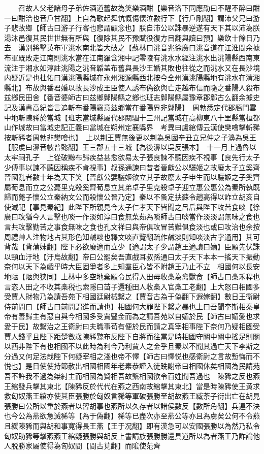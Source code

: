 　　召故人父老諸母子弟佐酒道舊故為笑樂酒酣【樂音洛下同應劭曰不醒不醉曰酣一曰酣洽也音戶甘翻】上自為歌起舞忼慨傷懷泣數行下【行戶剛翻】謂沛父兄曰游子悲故鄉【師古曰游子行客也悲謂顧念也】朕自沛公以誅暴逆遂有天下其以沛為朕湯沐邑復其民世世無有所與【復除其民不豫賦役復方目翻與讀曰預】樂飲十餘日乃去　漢别將擊英布軍洮水南北皆大破之【蘇林曰洮音兆徐廣曰洮音道在江淮間余據布軍既敗走江南則洮水當在江南羅含湘中記零陵有洮水水經注洮水出洮陽縣西南東流注于湘水如淳註洮陽之洮音韜盖布舊與長沙王婚其敗也往從之而洮水又在長沙境内疑近是也杜佑曰漢洮陽縣城在永州湘源縣西北按今全州漢洮陽縣地有洮水在清湘縣北】布故與番君婚以故長沙成王臣使人誘布偽欲與亡走越布信而隨之番陽人殺布兹鄉民田舍【番音婆師古曰兹鄉鄡陽縣之鄉也班志鄡陽縣屬豫章郡鄡古么翻余據史記及漢書高紀皆言追斬布番陽竊意兹鄉當在番陽界非鄡陽】　周勃悉定代郡鴈門雲中地斬陳豨於當城【班志當城縣屬代郡闞駰十三州記當城在高柳東八十里縣當桓都山作城故曰當城史記正義曰當城在朔州定襄縣界　考異曰盧綰傳云漢使樊噲擊斬豨按斬豨者周勃非樊噲也】　上以荆王賈無後更以荆為吳國辛丑立兄仲之子濞為吳王【服䖍曰濞音帔普懿翻】王三郡五十三城【為後濞以吳反張本】　十一月上過魯以太牢祠孔子　上從破黥布歸疾益甚愈欲易太子張良諫不聽因疾不視事【良先行太子少傅事以諫不聽因稱疾不肯視事】叔孫通諫曰昔者晉獻公以驪姬之故廢太子立奚齊晉國亂者數十年為天下笑【晉獻公嬖驪姬欲立其子故廢太子申生而以驪姬之子奚齊屬荀息而立之公薨里克殺奚齊荀息立其弟卓子里克殺卓子迎立惠公惠公為秦所執既歸而薨子懷公立秦納文公而殺懷公晉乃定】秦以不蚤定扶蘇令趙高得以詐立胡亥自使滅祀【事見秦紀】此陛下所親見今太子仁孝天下皆聞之呂后與陛下攻苦食啖【徐廣曰攻猶今人言擊也啖一作淡如淳曰食無菜茹為啖師古曰啖當作淡淡謂無味之食也言共攻擊勤苦之事食無味之食也孔文祥曰與帝俱攻冒苦難俱食淡也或曰攻治也余按周禮艸人注物地占其形色知鹹啖也釋文啖直覽翻疏作鹹淡則知啖淡古字通用】其可背哉【背蒲妹翻】陛下必欲廢適而立少【適謂太子少謂趙王適讀曰嫡】臣願先伏誅以頸血汙地【汙烏故翻】帝曰公罷矣吾直戲耳叔孫通曰太子天下本本一搖天下振動奈何以天下為戲乎時大臣固爭者多上知羣臣心皆不附趙王乃止不立　相國何以長安地陿【陿與狭同】上林中多空地棄願令民得入田毋收槀為禽獸食【師古曰槀禾稈也言恣人田之不收其槀税也索隱曰苗子還種田人收槀入官槀工老翻】上大怒曰相國多受賈人財物乃為請吾苑下相國廷尉械繫之【賈音古為于偽翻下遐嫁翻】數日王衛尉侍前問曰【師古曰前問謂進而請也】相國何大罪陛下繫之暴也上曰吾聞李斯相秦皇帝有善歸主有惡自與今相國多受賈豎金而為之請吾苑以自媚於民【師古曰媚愛也求愛于民】故繫治之王衛尉曰夫職事苟有便於民而請之真宰相事陛下奈何乃疑相國受賈人錢乎且陛下距楚數歲陳豨黥布反陛下自將而往當是時相國守關中關中搖足則關以西非陛下有也相國不以此時為利今乃利賈人之金乎且秦以不聞其過亡天下李斯之分過又何足法哉陛下何疑宰相之淺也帝不懌【師古曰懌悦也感衛尉之言故慙悔而不悦也】是日使使持節赦出相國相國年老素恭謹入徒跣謝帝曰相國休矣相國為民請苑吾不許我不過為桀紂主而相國為賢相吾故繫相國欲令百姓聞吾過也　陳豨之反也燕王綰發兵擊其東北【陳豨反於代代在燕之西南故綰擊其東北】當是時陳豨使王黄求救匈奴燕王綰亦使其臣張勝於匈奴言豨等軍破張勝至胡故燕王臧荼子衍出亡在胡見張勝曰公所以重於燕者以習胡事也燕所以久存者以諸侯數反【數所角翻】兵連不決也今公為燕欲急滅豨等【為于偽翻】豨等已盡次亦至燕公等亦且為虜矣公何不令燕且緩陳豨而與胡和事寛得長王燕【王于况翻】即有漢急可以安國張勝以為然乃私令匈奴助豨等擊燕燕王綰疑張勝與胡反上書請族張勝勝還具道所以為者燕王乃詐論他人脱勝家屬使得為匈奴間【間古莧翻】而隂使范齊